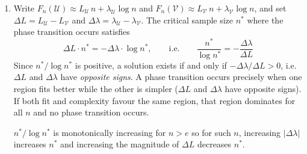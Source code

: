 \documentclass[11pt]{article}
\newcommand{\U}{\mathcal{U}}
\newcommand{\V}{\mathcal{V}}
\begin{document}
\begin{solution}
\begin{enumerate}
    \item
        Write $F_n(\U) \approx L_\U \, n + \lambda_\U \log n$ and
        $F_n(\V) \approx L_\V \, n + \lambda_\V \log n$, and set
        $\Delta L = L_\U - L_\V$ and
        $\Delta\lambda = \lambda_\U - \lambda_\V$. The critical sample
        size $n^*$ where the phase transition occurs satisfies
        \[
            \Delta L \cdot n^* = -\Delta\lambda \cdot \log n^*,
            \qquad\text{i.e.}\qquad
            \frac{n^*}{\log n^*} = -\frac{\Delta\lambda}{\Delta L}
        \]
        Since $n^*/\log n^*$ is positive, a solution exists if
        and only if $-\Delta\lambda / \Delta L > 0$, i.e.\ $\Delta L$
        and $\Delta\lambda$ have \emph{opposite signs}. A phase transition occurs precisely when one region fits better
        while the other is simpler ($\Delta L$ and $\Delta\lambda$ have
        opposite signs). If both fit and complexity favour the same
        region, that region dominates for all $n$ and no phase transition
        occurs.

        $n^*/\log n^*$ is monotonically increasing for $n > e$ so for such $n$, increasing $|\Delta \lambda|$ increases $n^*$ and increasing the magnitude of $\Delta L$ decreases $n^*$.
        
        \qedhere
\end{enumerate}
\end{solution}
\end{document}
